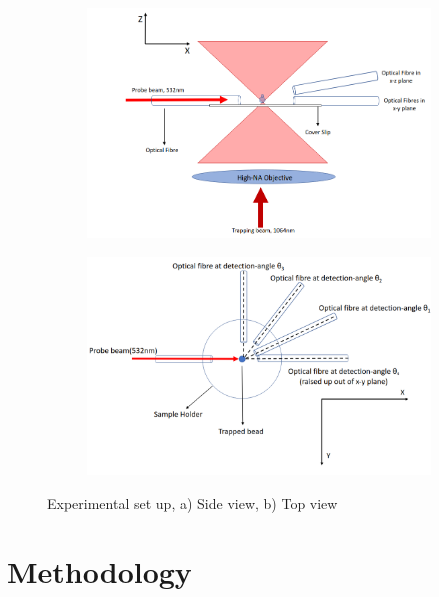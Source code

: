 \documentclass[final,  3p]{elsarticle}
\begin{document}
\begin{figure}
\centering
\begin{subfigure}{0.45\textwidth}
	\subcaption{}
	\includegraphics[width=\textwidth, height=0.25\textheight]{./Images/fig1a.png}
\end{subfigure}
\begin{subfigure}{0.45\textwidth}
	\subcaption{}
	\includegraphics[width=\textwidth, height=0.25\textheight]{./Images/fig1b.png}
\end{subfigure}
\caption{\label{fig:setup}
  Experimental set up, a) Side view, b) Top view
%
}
\end{figure}

\printnomenclature[0.55in]

\section{Methodology}
\label{sec:Method}
\end{document}

